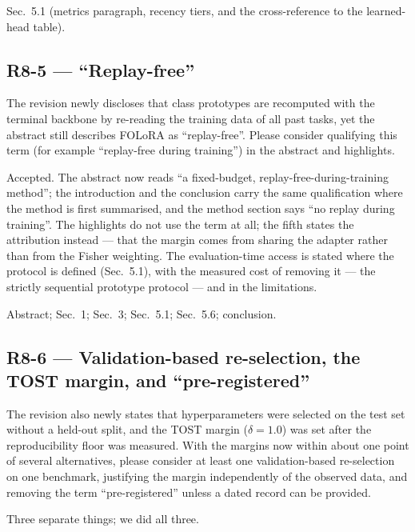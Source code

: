 \change Sec.~5.1 (metrics paragraph, recency tiers, and the
cross-reference to the learned-head table).

\subsection*{R8-5 --- ``Replay-free''}

\begin{rquote}
The revision newly discloses that class prototypes are recomputed with the terminal backbone by
re-reading the training data of all past tasks, yet the abstract still describes FOLoRA as
``replay-free''. Please consider qualifying this term (for example ``replay-free during
training'') in the abstract and highlights.
\end{rquote}

\resp Accepted. The abstract now reads ``a fixed-budget, replay-free-during-training
method''; the introduction and the conclusion carry the same qualification where the method
is first summarised, and the method section says ``no replay during training''. The
highlights do not use the term at all; the fifth states the
attribution instead --- that the margin comes from sharing the adapter rather than from the
Fisher weighting. The evaluation-time access is stated where the protocol is defined
(Sec.~5.1), with the measured cost of removing it --- the strictly sequential
prototype protocol --- and in the limitations.

\change Abstract; Sec.~1; Sec.~3; Sec.~5.1; Sec.~5.6; conclusion.

\subsection*{R8-6 --- Validation-based re-selection, the TOST margin, and ``pre-registered''}

\begin{rquote}
The revision also newly states that hyperparameters were selected on the test set without a
held-out split, and the TOST margin ($\delta{=}1.0$) was set after the reproducibility floor
was measured. With the margins now within about one point of several alternatives, please
consider at least one validation-based re-selection on one benchmark, justifying the margin
independently of the observed data, and removing the term ``pre-registered'' unless a dated
record can be provided.
\end{rquote}

\resp Three separate things; we did all three.

